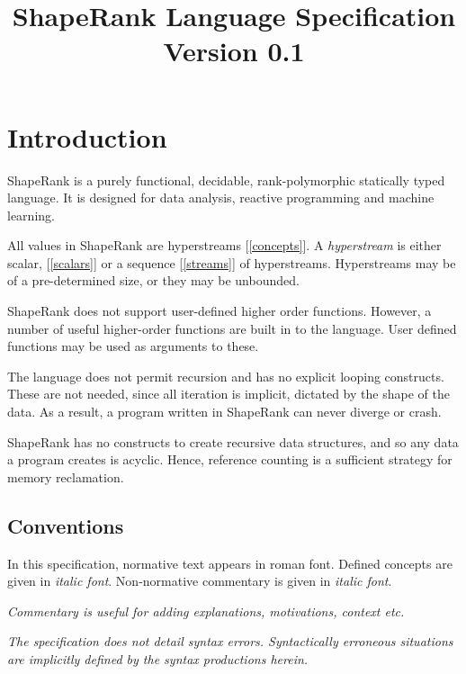 \documentclass{article}
\begin{document}
\title{ShapeRank Language Specification\\
{\large Version 0.1}
}
\maketitle

\tableofcontents

\section{Introduction}

ShapeRank is a purely functional, decidable, rank-polymorphic statically typed language. It is designed for data analysis, reactive programming and machine learning. 

All values in ShapeRank are hyperstreams [\ref{concepts}]. A {\em hyperstream} is either scalar, [\ref{scalars}] or a sequence [\ref{streams}] of hyperstreams. Hyperstreams may be of a pre-determined size, or they may be unbounded. 

ShapeRank does not support user-defined higher order functions. However, a number of useful higher-order functions are built in to the language. User defined functions may be used as arguments to these.

The language does not permit recursion and has no explicit looping constructs. These are not needed, since all iteration is implicit, dictated by the shape of the data. As a result, a program written in ShapeRank can never diverge or crash. 

ShapeRank has no constructs to create recursive data structures, and so any data a program creates is acyclic. Hence, reference counting is a sufficient strategy for memory reclamation.



\subsection{Conventions}
\label{conventions}

In this specification, normative text appears in roman font. Defined concepts are given in {\em italic font}. Non-normative commentary is given in {\em italic font}.

{\em Commentary is useful for adding explanations, motivations, context etc.}

{\em 
The specification does not detail syntax errors. Syntactically erroneous situations are implicitly defined by the syntax productions herein.
}
\end{document}
